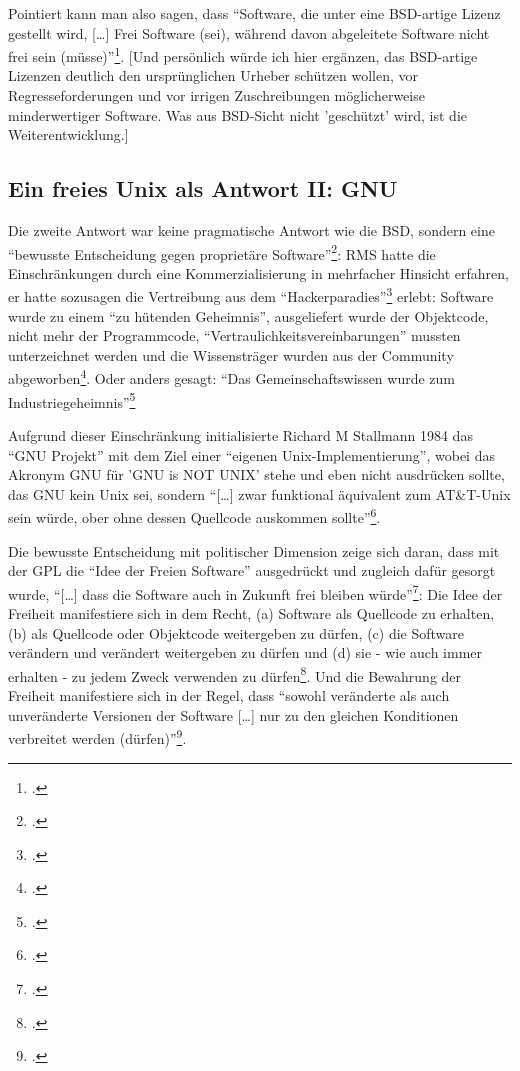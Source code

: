 \documentclass[DIV=calc,BCOR=5mm,11pt,headings=small,oneside,abstract=true, toc=bib]{scrartcl}
\begin{document}
Pointiert kann man also sagen, dass \enquote{Software, die unter eine
BSD-artige Lizenz gestellt wird, [\ldots] Frei Software (sei), während
davon abgeleitete Software nicht frei sein
(müsse)}\footcite[vgl.][108]{Eckl2004a}. [Und persönlich würde ich hier
ergänzen, das BSD-artige Lizenzen deutlich den ursprünglichen Urheber schützen
wollen, vor Regresseforderungen und vor irrigen Zuschreibungen möglicherweise
minderwertiger Software. Was aus BSD-Sicht nicht 'geschützt' wird, ist die
Weiterentwicklung.]

\subsection{Ein freies Unix als Antwort II: GNU}

Die zweite Antwort war keine pragmatische Antwort wie die BSD, sondern eine
\enquote{bewusste Entscheidung gegen proprietäre
Software}\footcite[vgl.][108]{Eckl2004a}: RMS hatte die Einschränkungen
durch eine Kommerzialisierung in mehrfacher Hinsicht erfahren, er hatte
sozusagen die Vertreibung aus dem
\enquote{Hackerparadies}\footcite[vgl.][109 Anm 117 - nach
Grassmuck]{Eckl2004a} erlebt: Software wurde zu einem \enquote{zu hütenden
Geheimnis}, ausgeliefert wurde der Objektcode, nicht mehr der
Programmcode, \enquote{Vertraulichkeitsvereinbarungen} mussten unterzeichnet
werden und die Wissensträger wurden aus der Community
abgeworben\footcite[vgl.][109]{Eckl2004a}. Oder anders gesagt: \enquote{Das
Gemeinschaftswissen wurde zum
Industriegeheimnis}\footcite[][109]{Eckl2004a}

Aufgrund dieser Einschränkung initialisierte Richard M Stallmann 1984 das
\enquote{GNU Projekt} mit dem Ziel einer \enquote{eigenen
Unix-Implementierung}, wobei das Akronym GNU für 'GNU is NOT UNIX' stehe
und eben nicht ausdrücken sollte, das GNU kein Unix sei, sondern \enquote{[\ldots]
zwar funktional äquivalent zum AT\&T-Unix sein würde, ober ohne dessen
Quellcode auskommen sollte}\footcite[][109]{Eckl2004a}.

Die bewusste Entscheidung mit politischer Dimension zeige sich daran, dass mit
der GPL die \enquote{Idee der Freien Software} ausgedrückt und zugleich
dafür gesorgt wurde, \enquote{[\ldots] dass die Software auch in Zukunft
frei bleiben würde}\footcite[vgl.][110]{Eckl2004a}: Die Idee der Freiheit
manifestiere sich in dem Recht, (a) Software als Quellcode zu erhalten, (b) als
Quellcode oder Objektcode weitergeben zu dürfen, (c) die Software verändern und
verändert weitergeben zu dürfen und (d) sie - wie auch immer erhalten - zu jedem
Zweck verwenden zu dürfen\footcite[vgl.][110]{Eckl2004a}. Und die Bewahrung der
Freiheit manifestiere sich in der Regel, dass \enquote{sowohl veränderte
als auch unveränderte Versionen der Software [\ldots] nur zu den gleichen
Konditionen verbreitet werden (dürfen)}\footcite[vgl.][110]{Eckl2004a}.
\end{document}
